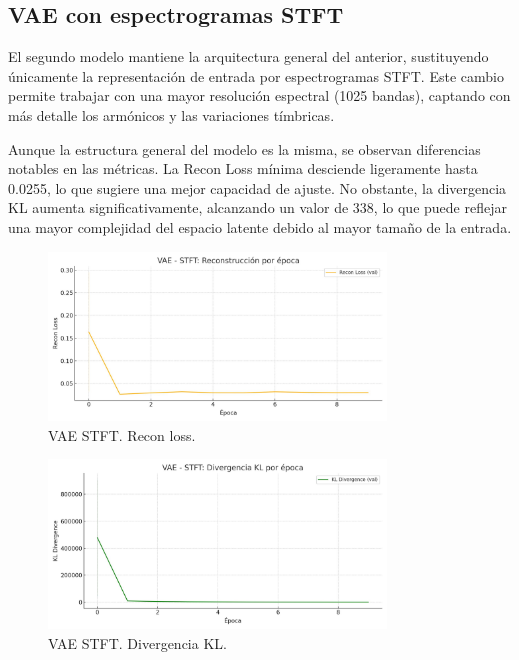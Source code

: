 \subsection{VAE con espectrogramas STFT}

El segundo modelo mantiene la arquitectura general del anterior, sustituyendo únicamente la representación de entrada por espectrogramas STFT. Este cambio permite trabajar con una mayor resolución espectral (1025 bandas), captando con más detalle los armónicos y las variaciones tímbricas.

Aunque la estructura general del modelo es la misma, se observan diferencias notables en las métricas. La Recon Loss mínima desciende ligeramente hasta 0.0255, lo que sugiere una mejor capacidad de ajuste. No obstante, la divergencia KL aumenta significativamente, alcanzando un valor de 338, lo que puede reflejar una mayor complejidad del espacio latente debido al mayor tamaño de la entrada.

\begin{figure}[H]
    \centering
    \includegraphics[width=0.8\textwidth]{images/vae_stft_recon_loss_plot.png}
    \caption{VAE STFT. Recon loss.}
\end{figure}

\begin{figure}[H]
    \centering
    \includegraphics[width=0.8\textwidth]{images/vae_stft_kl_plot.png}
    \caption{VAE STFT. Divergencia KL.}
\end{figure}

